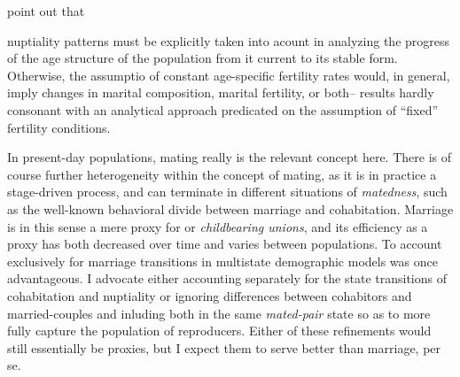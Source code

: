 
\citet{stolnitz1949recent} point out that 

\begin{citation}
nuptiality patterns
must be explicitly taken into acount in analyzing the progress of the age structure of the
population from it current to its stable form. Otherwise, the assumptio of
constant age-specific fertility rates would, in general, imply changes in
marital composition, marital fertility, or both-- results hardly consonant with
an analytical approach predicated on the assumption of ``fixed'' fertility
conditions.
\end{citation}

In present-day populations, mating really is the relevant concept here. There is
of course further heterogeneity within the concept of mating, as it is in
practice a stage-driven process, and can terminate in different situations of
\textit{matedness}, such as the well-known behavioral divide between marriage
and cohabitation. Marriage is in this sense a mere proxy for
 or \textit{childbearing unions}, and its efficiency as a
proxy has both decreased over time and varies between populations. To account exclusively for marriage transitions
in multistate demographic models was once advantageous. I
advocate either accounting separately for the state transitions of cohabitation
and nuptiality or ignoring differences between cohabitors and married-couples
and inluding both in the same \textit{mated-pair} state so as to more fully
capture the population of reproducers. Either of these refinements would still
essentially be proxies, but I expect them to serve better than marriage, per se.

